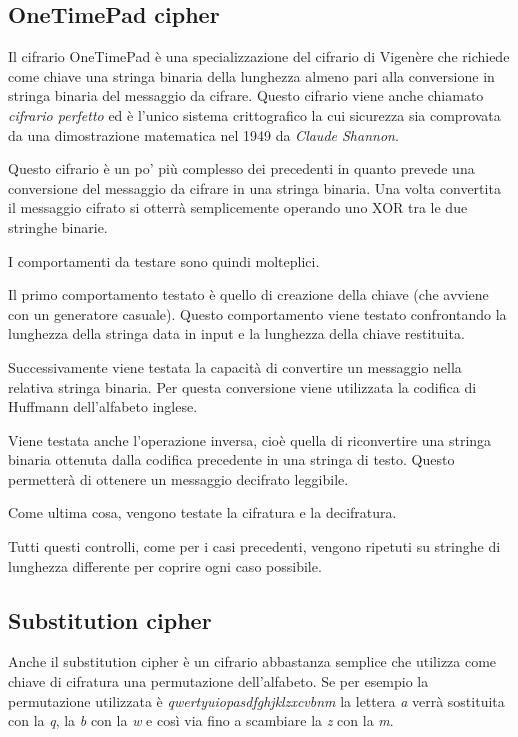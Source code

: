 		\subsection{OneTimePad cipher}
			Il cifrario OneTimePad è una specializzazione del cifrario di Vigenère che richiede come chiave una stringa binaria della lunghezza almeno pari alla conversione in stringa binaria del messaggio da cifrare. Questo cifrario viene anche chiamato \emph{cifrario perfetto} ed è l'unico sistema crittografico la cui sicurezza sia comprovata da una dimostrazione matematica nel 1949 da \emph{Claude Shannon}.
			
			Questo cifrario è un po' più complesso dei precedenti in quanto prevede una conversione del messaggio da cifrare in una stringa binaria. Una volta convertita il messaggio cifrato si otterrà semplicemente operando uno XOR tra le due stringhe binarie.
			
			I comportamenti da testare sono quindi molteplici.
			
			Il primo comportamento testato è quello di creazione della chiave (che avviene con un generatore casuale). Questo comportamento viene testato confrontando la lunghezza della stringa data in input e la lunghezza della chiave restituita.
			
			Successivamente viene testata la capacità di convertire un messaggio nella relativa stringa binaria. Per questa conversione viene utilizzata la codifica di Huffmann dell'alfabeto inglese.
			
			Viene testata anche l'operazione inversa, cioè quella di riconvertire una stringa binaria ottenuta dalla codifica precedente in una stringa di testo. Questo permetterà di ottenere un messaggio decifrato leggibile.
			
			Come ultima cosa, vengono testate la cifratura e la decifratura.
			
			Tutti questi controlli, come per i casi precedenti, vengono ripetuti su stringhe di lunghezza differente per coprire ogni caso possibile.
			
		\subsection{Substitution cipher}
			Anche il substitution cipher è un cifrario abbastanza semplice che utilizza come chiave di cifratura una permutazione dell'alfabeto. Se per esempio la permutazione utilizzata è \emph{qwertyuiopasdfghjklzxcvbnm} la lettera \emph{a} verrà sostituita con la \emph{q}, la \emph{b} con la \emph{w} e così via fino a scambiare la \emph{z} con la \emph{m}.
			
